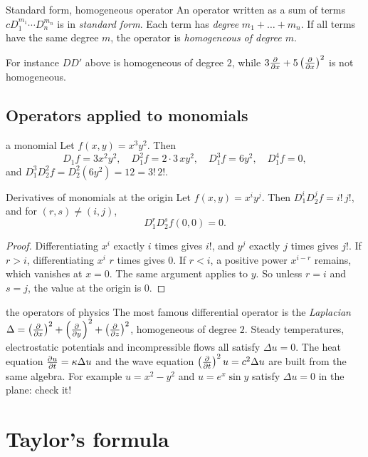 \begin{definition}{Standard form, homogeneous operator}
An operator written as a sum of terms $cD_1^{m_1}\cdots D_n^{m_n}$ is in \emph{standard form}.
Each term has \emph{degree} $m_1+\dots+m_n$. If all terms have the same degree $m$, the
operator is \emph{homogeneous of degree $m$}.
\end{definition}

For instance $DD'$ above is homogeneous of degree $2$, while
$3\frac{\partial }{\partial x}+5\left(\frac{\partial }{\partial x}\right)^2$ is not homogeneous.

\subsection{Operators applied to monomials}

\begin{example}{a monomial}
Let $f(x,y)=x^3y^2$. Then
\[ D_1f=3x^2y^2,\quad D_1^2f=2\cdot3\,xy^2,\quad D_1^3f=6y^2,\quad D_1^4f=0, \]
and $D_1^3D_2^2f=D_2^2(6y^2)=12=3!\,2!$.
\end{example}

\begin{proposition}[label=prop:mono]{Derivatives of monomials at the origin}
Let $f(x,y)=x^iy^j$. Then $D_1^iD_2^jf=i!\,j!$, and for $(r,s)\neq(i,j)$,
\[ D_1^rD_2^sf(0,0)=0 . \]
\end{proposition}

\begin{proof}
Differentiating $x^i$ exactly $i$ times gives $i!$, and $y^j$ exactly $j$ times gives $j!$.
If $r>i$, differentiating $x^i$ $r$ times gives $0$. If $r<i$, a positive power $x^{i-r}$
remains, which vanishes at $x=0$. The same argument applies to $y$. So unless $r=i$ and $s=j$,
the value at the origin is $0$.
\end{proof}

\begin{reallife}{the operators of physics}
The most famous differential operator is the \emph{Laplacian}
$\Delta=\left(\frac{\partial }{\partial x}\right)^2+\left(\frac{\partial }{\partial y}\right)^2+\left(\frac{\partial }{\partial z}\right)^2$, homogeneous of degree $2$.
Steady temperatures, electrostatic potentials and incompressible flows all satisfy
$\Delta u=0$. The heat equation $\frac{\partial u}{\partial t}=\kappa\Delta u$ and the wave equation
$\left(\frac{\partial }{\partial t}\right)^2u=c^2\Delta u$ are built from the same algebra. For example
$u=x^2-y^2$ and $u=e^x\sin y$ satisfy $\Delta u=0$ in the plane: check it!
\end{reallife}

\section{Taylor's formula}

